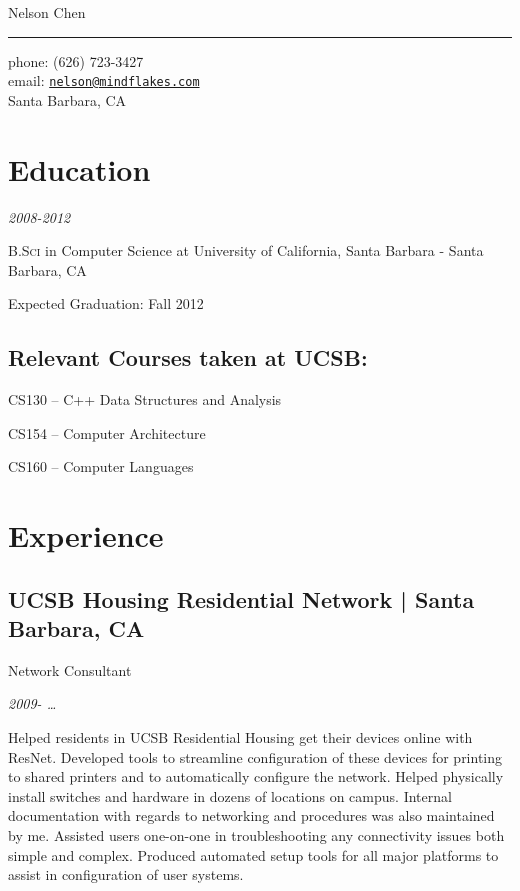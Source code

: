 \documentclass[10pt, letter]{article}
\makeatletter
\def\myname{Nelson Chen}
\def\myemail{nelson@mindflakes.com}
\def\mycellphone{(626) 723-3427}
\def\myaddress{Santa Barbara, CA}
\newcommand{\years}[1]{\marginnote{#1}}
\renewcommand{\years}[1]{{\emph{#1}}}
\newenvironment{packed_item}{
\begin{itemize}
  \setlength{\itemsep}{1pt}
  \setlength{\parskip}{0pt}
  \setlength{\parsep}{0pt}
}{\end{itemize}}
\makeatother
\begin{document}
{\LARGE \myname}\\
\hrule
\begin{multicols}{2}
\vspace{0.2in}
{\large phone: \mycellphone}\\[.05cm]
{\large email: \href{mailto:\myemail}{\texttt{\myemail}}}\\[.05cm]
\myaddress

\section*{Education}

\years{2008-2012}

\textsc{B.Sci} in Computer Science at University of California, Santa Barbara - Santa Barbara, CA

Expected Graduation: Fall 2012

\subsection*{Relevant Courses taken at UCSB:}

\begin{packed_item}
    \item CS130 -- C++ Data Structures and Analysis
    \item CS154 -- Computer Architecture
    \item CS160 -- Computer Languages
\end{packed_item}

\section*{Experience}

\subsection*{UCSB Housing Residential Network | {\footnotesize{Santa Barbara, CA}}}

Network Consultant

\years{2009- \ldots} 

Helped residents in UCSB Residential Housing get their devices online with ResNet.
Developed tools to streamline configuration of these devices for printing to
shared printers and to automatically configure the network. Helped physically
install switches and hardware in dozens of locations on campus. Internal
documentation with regards to networking and procedures was also maintained by
me. Assisted users one-on-one in troubleshooting any connectivity issues both
simple and complex. Produced automated setup tools for all major platforms to
assist in configuration of user systems.


\end{multicols}
\end{document}
